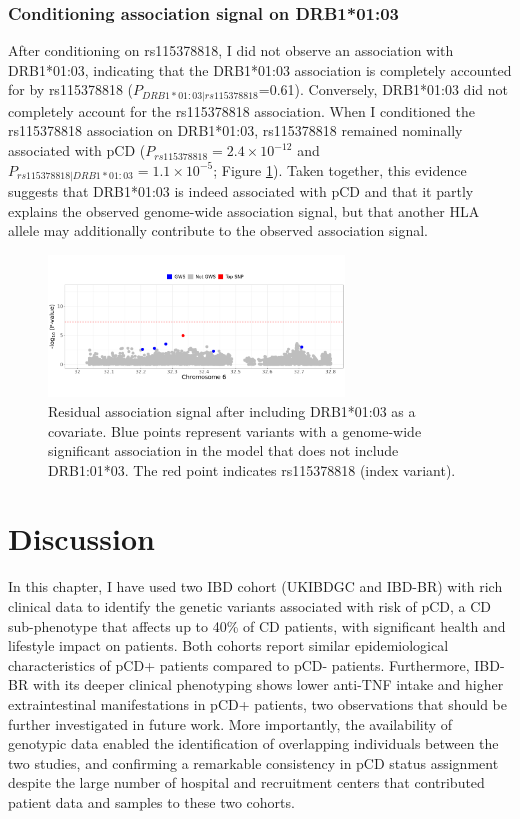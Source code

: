 \subsubsection{Conditioning association signal on DRB1*01:03}
After conditioning on rs115378818, I did not observe an association with DRB1*01:03, indicating that the  DRB1*01:03 association is completely accounted for by rs115378818 ($P_{DRB1*01:03|rs115378818}$=0.61). Conversely, DRB1*01:03 did not completely account for the rs115378818 association. When I conditioned the rs115378818 association on DRB1*01:03, rs115378818 remained nominally associated with pCD ($P_{rs115378818}=2.4\times10^{-12}$ and  $P_{rs115378818|DRB1*01:03}=1.1\times10^{-5}$; Figure \ref{fig:residual_assoc_plot}). Taken together, this evidence suggests that  DRB1*01:03 is indeed associated with pCD and that it partly explains the observed genome-wide association signal, but that another HLA allele may additionally contribute to the observed association signal.  
\begin{figure}[H] 
  \centering    
  \includegraphics[width=0.7\textwidth]{Vector/cond_regional_assoc_plot}
  \caption[Figure]{Residual association signal after including DRB1*01:03 as a covariate. Blue points represent variants with a genome-wide significant association in the model that does not include DRB1:01*03. The red point indicates rs115378818 (index variant).}
  \label{fig:residual_assoc_plot}
  \end{figure}

  
\section{Discussion}
In this chapter, I have used two IBD cohort (UKIBDGC and IBD-BR) with rich clinical data to identify the genetic variants associated with risk of pCD, a CD sub-phenotype that affects up to 40\% of CD patients, with significant health and lifestyle impact on patients. Both cohorts report similar epidemiological characteristics of pCD+ patients compared to pCD- patients. Furthermore, IBD-BR with its deeper clinical phenotyping shows lower anti-TNF intake and higher extraintestinal manifestations in pCD+ patients, two observations that should be further investigated in future work. More importantly, the availability of genotypic data enabled the identification of overlapping individuals between the two studies, and confirming a remarkable consistency in pCD status assignment despite the large number of hospital and recruitment centers that contributed patient data and samples to these two cohorts.\\

